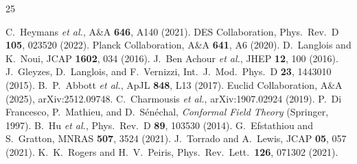 \documentclass[twocolumn,showpacs,preprintnumbers,amsmath,amssymb,prd]{revtex4-2}
\begin{document}
\begin{thebibliography}{25}

 C.~Heymans \textit{et al.}, A\&A \textbf{646}, A140 (2021).
 DES Collaboration, Phys.\ Rev.\ D \textbf{105}, 023520 (2022).
 Planck Collaboration, A\&A \textbf{641}, A6 (2020).
 D.~Langlois and K.~Noui, JCAP \textbf{1602}, 034 (2016).
 J.~Ben Achour \textit{et al.}, JHEP \textbf{12}, 100 (2016).
 J.~Gleyzes, D.~Langlois, and F.~Vernizzi, Int.\ J.\ Mod.\ Phys.\ D \textbf{23}, 1443010 (2015).
 B.~P.~Abbott \textit{et al.}, ApJL \textbf{848}, L13 (2017).
 Euclid Collaboration, A\&A (2025), arXiv:2512.09748.
 C.~Charmousis \textit{et al.}, arXiv:1907.02924 (2019).
 P.~Di Francesco, P.~Mathieu, and D.~S\'en\'echal, \textit{Conformal Field Theory} (Springer, 1997).
 B.~Hu \textit{et al.}, Phys.\ Rev.\ D \textbf{89}, 103530 (2014).
 G.~Efstathiou and S.~Gratton, MNRAS \textbf{507}, 3524 (2021).
 J.~Torrado and A.~Lewis, JCAP \textbf{05}, 057 (2021).
 K.~K.~Rogers and H.~V.~Peiris, Phys.\ Rev.\ Lett.\ \textbf{126}, 071302 (2021).

\end{thebibliography}
\end{document}
